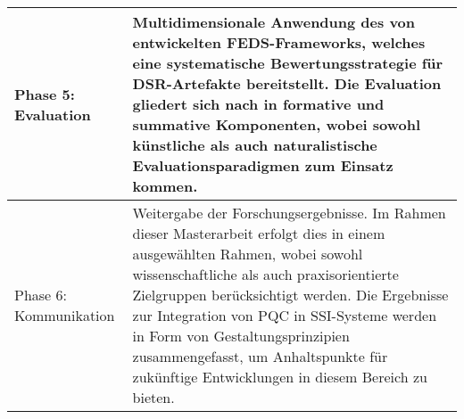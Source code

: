 \begin{longtable}{L{3.5cm}L{11cm}}
    \midrule
    Phase 5: \newline Evaluation &
    Multidimensionale Anwendung des von \textcite{venable_FEDSFrameworkEvaluationDesignScienceResearch_2016} entwickelten \ac{FEDS}-Frameworks, welches eine systematische Bewertungsstrategie für \ac{DSR}-Artefakte bereitstellt. Die Evaluation gliedert sich nach \textcite[S. 1]{venable_FEDSFrameworkEvaluationDesignScienceResearch_2016} in formative und summative Komponenten, wobei sowohl künstliche als auch naturalistische Evaluationsparadigmen zum Einsatz kommen. \\
    \midrule
    Phase 6: \newline Kommunikation &
    Weitergabe der Forschungsergebnisse. Im Rahmen dieser Masterarbeit erfolgt dies in einem ausgewählten Rahmen, wobei sowohl wissenschaftliche als auch praxisorientierte Zielgruppen berücksichtigt werden. Die Ergebnisse zur Integration von \ac{PQC} in \ac{SSI}-Systeme werden in Form von Gestaltungsprinzipien zusammengefasst, um Anhaltspunkte für zukünftige Entwicklungen in diesem Bereich zu bieten. \\
\end{longtable}